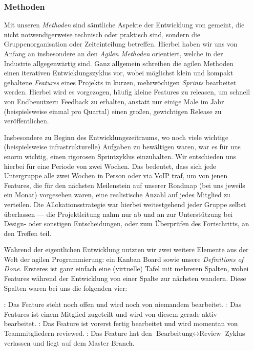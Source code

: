 
\subsubsection{Methoden}
\label{team:orga-workflow-methods}

Mit unseren \emph{Methoden} sind sämtliche Aspekte der Entwicklung von
\erasim{} gemeint, die nicht notwendigerweise technisch oder praktisch sind,
sondern die Gruppenorganisation oder Zeiteinteilung betreffen. Hierbei haben wir
uns von Anfang an insbesondere an den \emph{Agilen Methoden} orientiert, welche
in der Industrie allgegenwärtig sind. Ganz allgemein schreiben die agilen
Methoden einen iterativen Entwicklungszyklus vor, wobei möglichst klein und
kompakt gehaltene \emph{Features} eines Projekts in kurzen, mehrwöchigen
\emph{Sprints} bearbeitet werden. Hierbei wird es vorgezogen, häufig kleine
Features zu releasen, um schnell von Endbenutzern Feedback zu erhalten, anstatt
nur einige Male im Jahr (beispielsweise einmal pro Quartal) einen großen,
gewichtigen Release zu veröffentlichen.

Insbesondere zu Beginn des Entwicklungszeitraums, wo noch viele wichtige
(beispielsweise infrastrukturelle) Aufgaben zu bewältigen waren, war es für uns
enorm wichtig, einen rigorosen Sprintzyklus einzuhalten. Wir entschieden uns
hierbei für eine Periode von zwei Wochen. Das bedeutet, dass sich jede
Untergruppe alle zwei Wochen in Person oder via VoIP traf, um von jenen
Features, die für den nächsten Meilenstein auf unserer Roadmap (bei uns jeweils
ein Monat) vorgesehen waren, eine realistische Anzahl auf jedes Mitglied zu
verteilen. Die Allokationsstrategie war hierbei weitestgehend jeder Gruppe
selbst überlassen --- die Projektleitung nahm nur ab und an zur Unterstützung
bei Design- oder sonstigen Entscheidungen, oder zum Überprüfen des Fortschritts,
an den Treffen teil.

Während der eigentlichen Entwicklung nutzten wir zwei weitere Elemente aus der
Welt der agilen Programmierung: ein Kanban Board sowie unsere \emph{Definitions
of Done}. Ersteres ist ganz einfach eine (virtuelle) Tafel mit mehreren Spalten, wobei Features während der Entwicklung von einer Spalte zur nächsten wandern. Diese Spalten waren bei uns die folgenden vier:

\begin{senumerate}{-0.5cm}
  : Das Feature steht noch offen und wird noch von niemandem
  bearbeitet.
  : Das Features ist einem Mitglied zugeteilt und wird von
  diesem gerade aktiv bearbeitet.
  : Das Feature ist vorerst fertig bearbeitet und wird momentan
  von Teammitgliedern reviewed.
  : Das Feature hat den $\text{Bearbeitung} \leftrightarrow
  \text{Review}$ Zyklus verlassen und liegt auf dem Master Branch.
\end{senumerate}
\vspace{-0.5cm}

